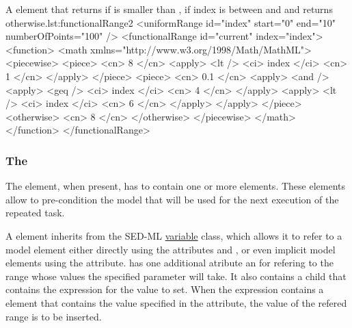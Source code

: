 \begin{myXmlLst}{A  element that returns  if 
   is smaller than ,  if index is between 
	 and  and returns  otherwise.}{lst:functionalRange2}
        <uniformRange id="index" start="0" end="10" numberOfPoints="100" />
        <functionalRange id="current" index="index">
          <function>
            <math xmlns="http://www.w3.org/1998/Math/MathML">
              <piecewise>
                <piece>
                  <cn> 8 </cn>
                  <apply>
                    <lt />
                    <ci> index </ci>
                    <cn> 1 </cn>
                  </apply>
                </piece>
                <piece>
                  <cn> 0.1 </cn>
                  <apply>
                    <and />
                    <apply>
                      <geq />
                      <ci> index </ci>
                      <cn> 4 </cn>
                    </apply>
                    <apply>
                      <lt />
                      <ci> index </ci>
                      <cn> 6 </cn>
                    </apply>
                  </apply>
                </piece>
                <otherwise>
                  <cn> 8 </cn>
                </otherwise>
              </piecewise>
            </math>
          </function>
        </functionalRange>
\end{myXmlLst}



\subsubsection{The }
\label{class:changes}
\label{class:setValue}

The  element, when present, has to contain one or more  elements. These elements allow to pre-condition the model that will be used for the next execution of the repeated task. %

A  element inherits from the SED-ML \hyperref[class:variable]{variable} class, which allows it to refer to a model element either directly using the attributes  and , or even implicit model elements using the  attribute.  has one additional atribute  an for refering to the range whose values the specified parameter will take. It also contains a child  that contains the expression for the value to set. When the expression contains a  element that contains the value specified in the  attribute, the value of the refered range is to be inserted. 

